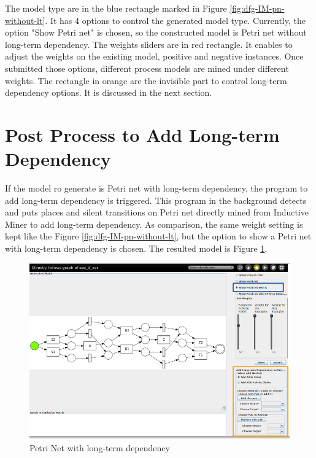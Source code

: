 The model type are in the blue rectangle marked in Figure \ref{fig:dfg-IM-pn-without-lt}. It has 4 options to control the generated model type. Currently, the option "Show Petri net" is chosen, so the constructed model is Petri net without long-term dependency. The weights sliders are in red rectangle. It enables to adjust the weights on the existing model, positive and negative instances. Once submitted those options, different process models are mined under different weights. The rectangle in orange are the invisible part to control long-term dependency options. It is discussed in the next section.

\section{Post Process to Add Long-term Dependency }
If the model ro generate is Petri net with long-term dependency, the program to add long-term dependency is triggered. This program in the background detects and puts places and silent transitions on Petri net directly mined from Inductive Miner to add long-term dependency. As comparison, the same weight setting is kept like the Figure \ref{fig:dfg-IM-pn-without-lt}, but the option to show a Petri net with long-term dependency is chosen. The resulted model is Figure \ref{fig:dfg-IM-pn-with-lt}. 
\begin{figure}
	\centering
	\includegraphics[width=\textwidth]{figures/implementation/dfg-IM-pn-with-lt.png}
	\caption{Petri Net with long-term dependency }
	\label{fig:dfg-IM-pn-with-lt}
\end{figure}

